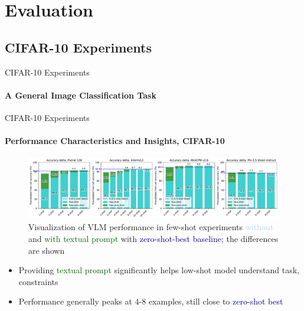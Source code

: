 \section{Evaluation}
\subsection{CIFAR-10 Experiments}
\begin{frame}{CIFAR-10 Experiments}
\framesubtitle{A General Image Classification Task}
  \vspace{-1em}
  \CifarDatasetSlide
\end{frame}


\begin{frame}{CIFAR-10 Experiments}
\framesubtitle{Performance Characteristics and Insights, CIFAR-10}
  \vspace{-2em}
  \begin{figure}
    \centering\hspace*{-2em}\includegraphics[width=1.1\linewidth]{figures/cifar_accuracy_delta_few_zero_shot_over_few_shot.pdf}
    \vspace{-1.6em}
    \caption{\centering Visualization of VLM performance in few-shot experiments \textcolor{lightblue}{without} and \textcolor{darkgreen}{with textual prompt} with \textcolor{darkblue}{zero-shot-best baseline}; the differences are shown}
  \end{figure}
  \vspace{-1.6em}
  \begin{itemize}
    \setlength{\itemsep}{0em}
    \item Providing \textcolor{darkgreen}{textual prompt} significantly helps low-shot model understand task, constraints
    \item Performance generally peaks at 4-8 examples, still close to \textcolor{darkblue}{zero-shot best}
  \end{itemize}
\end{frame}


